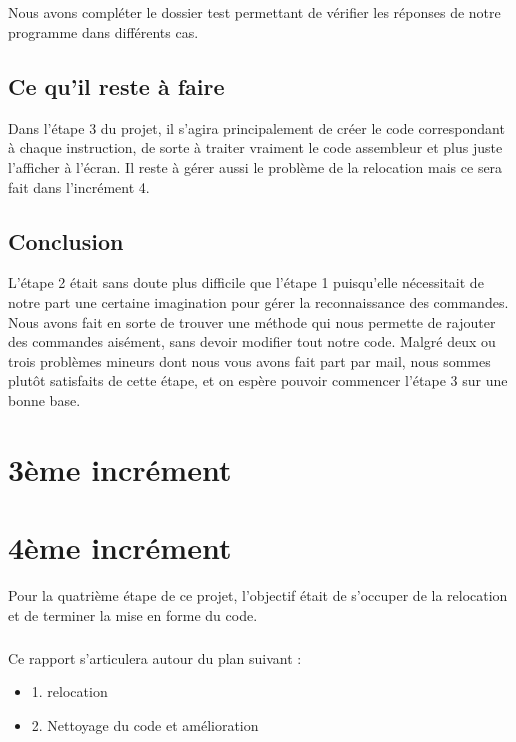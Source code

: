 \documentclass[10pt,a4paper]{report}
\begin{document}
\paragraph{}
	Nous avons compléter le dossier test permettant de vérifier les réponses de notre programme dans différents cas.

\section{Ce qu'il reste à faire}	

Dans l'étape 3 du projet, il s’agira principalement de créer le code correspondant à chaque instruction, de sorte à traiter vraiment le code assembleur et plus juste l’afficher à l’écran. Il reste à gérer aussi le problème de la relocation mais ce sera fait dans l’incrément 4.


	
	\section{Conclusion}

	L’étape 2 était sans doute plus difficile que l’étape 1 puisqu’elle nécessitait de notre part une certaine imagination pour gérer la reconnaissance des commandes. Nous avons fait en sorte de trouver une méthode qui nous permette de rajouter des commandes aisément, sans devoir modifier tout notre code. Malgré deux ou trois problèmes mineurs dont nous vous avons fait part par mail, nous sommes plutôt satisfaits de cette étape, et on espère pouvoir commencer l’étape 3 sur une bonne base.
	
\chapter{3ème incrément}

\chapter{4ème incrément}
Pour la quatrième étape de ce projet, l'objectif était de s'occuper de la relocation et de terminer la mise en forme du code.
\paragraph{}
Ce rapport s'articulera autour du plan suivant :
\begin{itemize}
	\item 1. relocation
	\item 2. Nettoyage du code et amélioration
\end{itemize}
\end{document}
